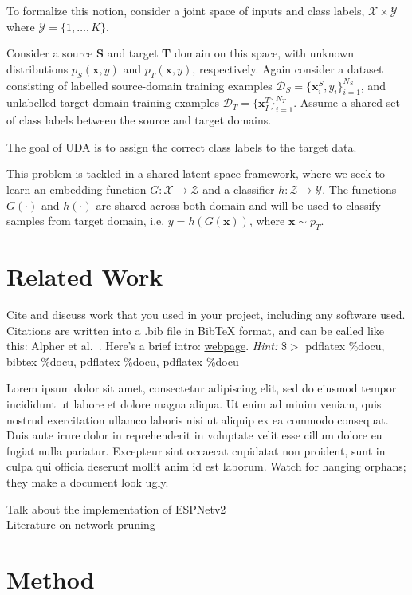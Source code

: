 \documentclass[10pt,twocolumn,letterpaper]{article}
\newcommand{\vect}[1]{\boldsymbol{\mathbf{#1}}}
\begin{document}
To formalize this notion, consider a joint space of inputs and class labels, \(\mathcal{X} \times \mathcal{Y}\) where \(\mathcal{Y} = \{1,\dots,K\}\). 

Consider a source \textbf{S} and target \textbf{T} domain on this space,  with unknown distributions \(p_S(\vect{x}, y)\) and \(p_T(\vect{x},y)\), respectively.  Again consider a dataset consisting of 
labelled source-domain training examples \(\mathcal{D}_S = \{\vect{x}_i^S, y_i\}_{i=1}^{N_S}\), and unlabelled target domain training examples \(\mathcal{D}_T = \{\vect{x}_I^T\}_{i=1}^{N_T}\).  Assume a shared set of class labels between the source and target domains. 

The goal of UDA is to assign the correct class labels to the target data.

This problem is tackled in a shared latent space framework, where we seek to learn an embedding function \(G: \mathcal{X} \to \mathcal{Z}\) and a classifier \(h: \mathcal{Z} \to \mathcal{Y}\).
The functions \(G(\cdot)\) and \(h(\cdot)\) are shared across both domain and will be used to classify samples from target domain, i.e. \(y = h(G(\vect{x}))\), where \(\vect{x} \sim p_T\).

\section{Related Work}

Cite and discuss work that you used in your project, including any software used. Citations are written into a .bib file in BibTeX format, and can be called like this: Alpher et al.~\cite{Alpher04}. Here's a brief intro: \href{http://www.andy-roberts.net/writing/latex/bibliographies}{webpage}. \emph{Hint:} \$$>$ pdflatex \%docu, bibtex \%docu, pdflatex \%docu, pdflatex \%docu

Lorem ipsum dolor sit amet, consectetur adipiscing elit, sed do eiusmod tempor incididunt ut labore et dolore magna aliqua. Ut enim ad minim veniam, quis nostrud exercitation ullamco laboris nisi ut aliquip ex ea commodo consequat. Duis aute irure dolor in reprehenderit in voluptate velit esse cillum dolore eu fugiat nulla pariatur. Excepteur sint occaecat cupidatat non proident, sunt in culpa qui officia deserunt mollit anim id est laborum. Watch for hanging orphans; they make a document look ugly.

Talk about the implementation of ESPNetv2 \\
Literature on network pruning

\section{Method}
\end{document}
